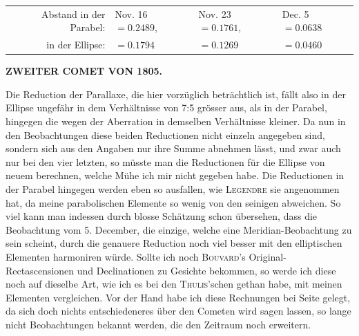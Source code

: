 \begin{center}\begingroup
\fontsize{9}{11}\selectfont
\setlength{\tabcolsep}{2pt}\renewcommand{\arraystretch}{1.12}
\begin{tabular}{rlll}
Abstand in der Parabel: & Nov. 16 $=0.2489$, & Nov. 23 $=0.1761$, & Dec. 5 $=0.0638$ \\
in der Ellipse: & $=0.1794$ & $=0.1269$ & $=0.0460$ \\
\end{tabular}\endgroup\end{center}
\clearpage
\thispagestyle{empty}
\noindent{}%
%
\parbox[t]{\dimexpr\linewidth-24mm\relax}{\centering\footnotesize\bfseries ZWEITER COMET VON 1805.\par}%
\makebox[12mm][r]{}\par\nobreak\medskip
\par\indent Die Reduction der Parallaxe, die hier vorzüglich beträchtlich ist, fällt also in der Ellipse ungefähr in dem Verhältnisse von 7:5 grösser aus, als in der Parabel, hingegen die wegen der Aberration in demselben Verhältnisse kleiner. Da nun in den Beobachtungen diese beiden Reductionen nicht einzeln angegeben sind, sondern sich aus den Angaben nur ihre Summe abnehmen lässt, und zwar auch nur bei den vier letzten, so müsste man die Reductionen für die Ellipse von neuem berechnen, welche Mühe ich mir nicht gegeben habe. Die Reductionen in der Parabel hingegen werden eben so ausfallen, wie \textsc{Legendre} sie angenommen hat, da meine parabolischen Elemente so wenig von den seinigen abweichen. So viel kann man indessen durch blosse Schätzung schon übersehen, dass die Beobachtung vom 5. December, die einzige, welche eine Meridian-Beobachtung zu sein scheint, durch die genauere Reduction noch viel besser mit den elliptischen Elementen harmoniren würde. Sollte ich noch \textsc{Bouvard}'s Original-Rectascensionen und Declinationen zu Gesichte bekommen, so werde ich diese noch auf dieselbe Art, wie ich es bei den \textsc{Thulis}'schen gethan habe, mit meinen Elementen vergleichen. Vor der Hand habe ich diese Rechnungen bei Seite gelegt, da sich doch nichts entschiedeneres über den Cometen wird sagen lassen, so lange nicht Beobachtungen bekannt werden, die den Zeitraum noch erweitern.

